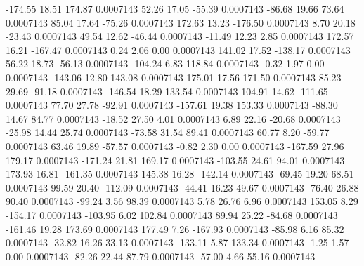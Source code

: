      -174.55       18.51      174.87     0.0007143
       52.26       17.05      -55.39     0.0007143
      -86.68       19.66       73.64     0.0007143
       85.04       17.64      -75.26     0.0007143
      172.63       13.23     -176.50     0.0007143
        8.70       20.18      -23.43     0.0007143
       49.54       12.62      -46.44     0.0007143
      -11.49       12.23        2.85     0.0007143
      172.57       16.21     -167.47     0.0007143
        0.24        2.06        0.00     0.0007143
      141.02       17.52     -138.17     0.0007143
       56.22       18.73      -56.13     0.0007143
     -104.24        6.83      118.84     0.0007143
       -0.32        1.97        0.00     0.0007143
     -143.06       12.80      143.08     0.0007143
      175.01       17.56      171.50     0.0007143
       85.23       29.69      -91.18     0.0007143
     -146.54       18.29      133.54     0.0007143
      104.91       14.62     -111.65     0.0007143
       77.70       27.78      -92.91     0.0007143
     -157.61       19.38      153.33     0.0007143
      -88.30       14.67       84.77     0.0007143
      -18.52       27.50        4.01     0.0007143
        6.89       22.16      -20.68     0.0007143
      -25.98       14.44       25.74     0.0007143
      -73.58       31.54       89.41     0.0007143
       60.77        8.20      -59.77     0.0007143
       63.46       19.89      -57.57     0.0007143
       -0.82        2.30        0.00     0.0007143
     -167.59       27.96      179.17     0.0007143
     -171.24       21.81      169.17     0.0007143
     -103.55       24.61       94.01     0.0007143
      173.93       16.81     -161.35     0.0007143
      145.38       16.28     -142.14     0.0007143
      -69.45       19.20       68.51     0.0007143
       99.59       20.40     -112.09     0.0007143
      -44.41       16.23       49.67     0.0007143
      -76.40       26.88       90.40     0.0007143
      -99.24        3.56       98.39     0.0007143
        5.78       26.76        6.96     0.0007143
      153.05        8.29     -154.17     0.0007143
     -103.95        6.02      102.84     0.0007143
       89.94       25.22      -84.68     0.0007143
     -161.46       19.28      173.69     0.0007143
      177.49        7.26     -167.93     0.0007143
      -85.98        6.16       85.32     0.0007143
      -32.82       16.26       33.13     0.0007143
     -133.11        5.87      133.34     0.0007143
       -1.25        1.57        0.00     0.0007143
      -82.26       22.44       87.79     0.0007143
      -57.00        4.66       55.16     0.0007143
